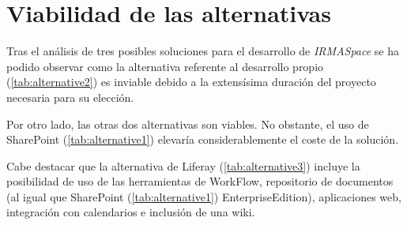 \newpage
\section{Viabilidad de las alternativas}

\par Tras el análisis de tres posibles soluciones para el desarrollo de \textit{IRMASpace} se ha podido observar como la alternativa referente al desarrollo propio (\ref{tab:alternative2}) es inviable debido a la extensísima duración del proyecto necesaria para su elección.

\par Por otro lado, las otras dos alternativas son viables. No obstante, el uso de SharePoint (\ref{tab:alternative1}) elevaría considerablemente el coste de la solución.

\par Cabe destacar que la alternativa de Liferay (\ref{tab:alternative3}) incluye la posibilidad de uso de las herramientas de WorkFlow, repositorio de documentos (al igual que  SharePoint (\ref{tab:alternative1}) EnterpriseEdition), aplicaciones web, integración con calendarios e inclusión de una wiki.
